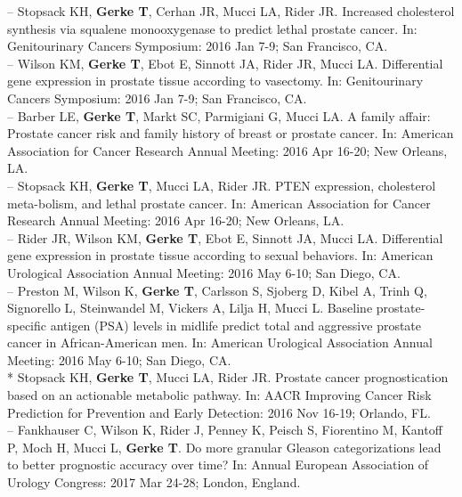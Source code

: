 \documentclass[11pt, a4paper]{article} %
\begin{document}
-- Stopsack KH, {\bf Gerke T}, Cerhan JR, Mucci LA, Rider JR. Increased cholesterol synthesis via squalene monooxygenase to predict lethal prostate cancer. In: Genitourinary Cancers Symposium: 2016 Jan 7-9; San Francisco, CA.\\

-- Wilson KM, {\bf Gerke T}, Ebot E, Sinnott JA, Rider JR, Mucci LA. Differential gene expression in prostate tissue according to vasectomy. In: Genitourinary Cancers Symposium: 2016 Jan 7-9; San Francisco, CA.\\

-- Barber LE, {\bf Gerke T}, Markt SC, Parmigiani G, Mucci LA. A family affair: Prostate cancer risk and family history of breast or prostate cancer. In: American Association for Cancer Research Annual Meeting: 2016 Apr 16-20; New Orleans, LA.\\

-- Stopsack KH, {\bf Gerke T}, Mucci LA, Rider JR. PTEN expression, cholesterol meta-bolism, and lethal prostate cancer. In: American Association for Cancer Research Annual Meeting: 2016 Apr 16-20; New Orleans, LA.\\

-- Rider JR, Wilson KM, {\bf Gerke T}, Ebot E, Sinnott JA, Mucci LA. Differential gene expression in prostate tissue according to sexual behaviors. In: American Urological Association Annual Meeting: 2016 May 6-10; San Diego, CA.\\

-- Preston M, Wilson K, {\bf Gerke T}, Carlsson S, Sjoberg D, Kibel A, Trinh Q, Signorello L, Steinwandel M, Vickers A, Lilja H, Mucci L. Baseline prostate-specific antigen (PSA) levels in midlife predict total and aggressive prostate cancer in African-American men. In: American Urological Association Annual Meeting: 2016 May 6-10; San Diego, CA.\\

* Stopsack KH, {\bf Gerke T}, Mucci LA, Rider JR. Prostate cancer prognostication based on an actionable metabolic pathway. In: AACR Improving Cancer Risk Prediction for Prevention and Early Detection: 2016 Nov 16-19; Orlando, FL.\\

-- Fankhauser C, Wilson K, Rider J, Penney K, Peisch S, Fiorentino M, Kantoff P, Moch H, Mucci L, {\bf Gerke T}. Do more granular Gleason categorizations lead to better prognostic accuracy over time? In: Annual European Association of Urology Congress: 2017 Mar 24-28; London, England.\\
\end{document}
